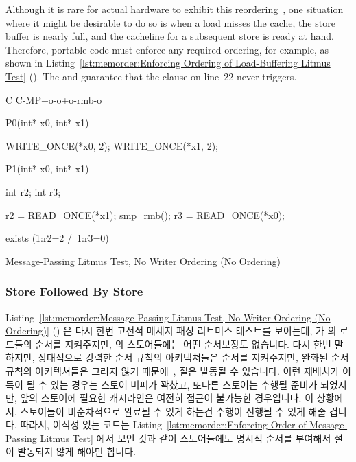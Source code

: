 Although it is rare for actual hardware to
exhibit this reordering~\cite{LucMaranget2017aarch64},
one situation where it might be desirable to do so is when a load
misses the cache, the store buffer is nearly full, and the cacheline for
a subsequent store is ready at hand.
Therefore, portable code must enforce any required ordering, for example,
as shown in
Listing~\ref{lst:memorder:Enforcing Ordering of Load-Buffering Litmus Test}
().
The  and  guarantee that
the  clause on line~22 never triggers.
\fi

\begin{listing}[tbp]
{ \scriptsize
\begin{verbbox}[\LstLineNo]
C C-MP+o-o+o-rmb-o

{
}

P0(int* x0, int* x1) {

  WRITE_ONCE(*x0, 2);
  WRITE_ONCE(*x1, 2);

}

P1(int* x0, int* x1) {

  int r2;
  int r3;

  r2 = READ_ONCE(*x1);
  smp_rmb();
  r3 = READ_ONCE(*x0);

}

exists (1:r2=2 /\ 1:r3=0)
\end{verbbox}
}
\centering
\theverbbox
\caption{Message-Passing Litmus Test, No Writer Ordering (No Ordering)}
\label{lst:memorder:Message-Passing Litmus Test, No Writer Ordering (No Ordering)}
\end{listing}

\subsubsection{Store Followed By Store}
\label{sec:memorder:Store Followed By Store}

Listing~\ref{lst:memorder:Message-Passing Litmus Test, No Writer Ordering (No Ordering)}
()
은 다시 한번 고전적 메세지 패싱 리트머스 테스트를 보이는데,  가
 의 로드들의 순서를 지켜주지만,  의 스토어들에는 어떤
순서보장도 없습니다.
다시 한번 말하지만, 상대적으로 강력한 순서 규칙의 아키텍쳐들은 순서를
지켜주지만, 완화된 순서 규칙의 아키텍쳐들은 그러지 않기
때문에~\cite{JadeAlglave2011ppcmem},  절은 발동될 수 있습니다.
이런 재배치가 이득이 될 수 있는 경우는 스토어 버퍼가 꽉찼고, 또다른 스토어는
수행될 준비가 되었지만, 앞의 스토어에 필요한 캐시라인은 여전히 접근이 불가능한
경우입니다.
이 상황에서, 스토어들이 비순차적으로 완료될 수 있게 하는건 수행이 진행될 수
있게 해줄 겁니다.
따라서, 이식성 있는 코드는
Listing~\ref{lst:memorder:Enforcing Order of Message-Passing Litmus Test} 에서
보인 것과 같이 스토어들에도 명시적 순서를 부여해서  절이 발동되지
않게 해야만 합니다.
\iffalse

